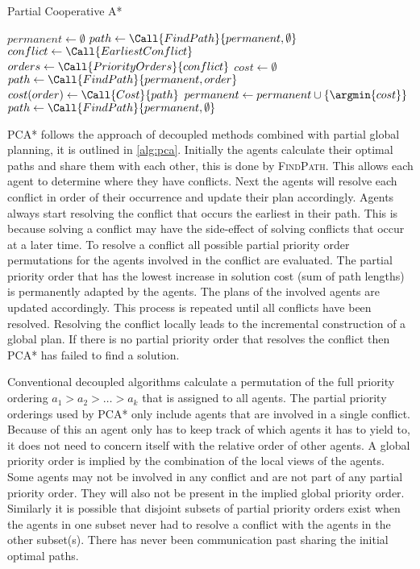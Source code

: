 \begin{algorithm}[t]
	\caption{Partial Cooperative A*}
	\label{alg:pca}
	\begin{algorithmic}[1]
		\State $permanent \gets \emptyset$
		\State $path \gets \Call{FindPath}{permanent, \emptyset}$
			\State $conflict \gets \Call{EarliestConflict}$
			\State $orders \gets \Call{PriorityOrders}{conflict}$ 
			\State $cost \gets \emptyset$
				\State $path \gets \Call{FindPath}{permanent, order}$
				\State $cost(order) \gets \Call{Cost}{path}$
			\EndFor
			\State $permanent \gets permanent \cup \{ \argmin{cost} \}$
			\State $path \gets \Call{FindPath}{permanent, \emptyset}$
		\EndWhile
	\end{algorithmic}
\end{algorithm}

PCA* follows the approach of decoupled methods combined with partial 
global planning, it is outlined in \autoref{alg:pca}. Initially the agents 
calculate their optimal paths and share them with each other, this is done by 
\textsc{FindPath}. This allows
each agent to determine where they have conflicts. Next the
agents will resolve each conflict in order of their occurrence and update their 
plan accordingly. Agents always start resolving the conflict that occurs the 
earliest in their path. This is because solving a conflict may have the 
side-effect of solving conflicts that occur at a later time. To resolve a 
conflict all possible partial priority order permutations for the agents 
involved in the conflict are evaluated. The partial priority order that has the 
lowest increase in solution cost (sum of path lengths) is permanently adapted 
by the agents. The plans of the involved agents are updated accordingly. This 
process is repeated until all conflicts have been resolved. Resolving the 
conflict locally leads to the incremental construction of a global plan. If 
there is no partial priority order that resolves the conflict then PCA* has 
failed to find a solution.

Conventional decoupled algorithms calculate a permutation of the full priority 
ordering $a_1 > a_2 > \ldots > a_k$ that is assigned to all agents. The partial 
priority orderings used by PCA* only include agents that are involved in a 
single conflict. Because of this an agent only has to keep track of which 
agents it has to yield to, it does not need to concern itself with the 
relative order of other agents. A global priority order is implied by the 
combination of the local views of the agents. Some agents may not be involved 
in any conflict and are not part of any partial priority order. 
They will also not be present in the implied global priority order. Similarly 
it is possible that disjoint subsets of partial priority orders exist when the 
agents in one subset never had to resolve a conflict with the agents in the 
other subset(s). There has never been communication past sharing the initial 
optimal paths.

